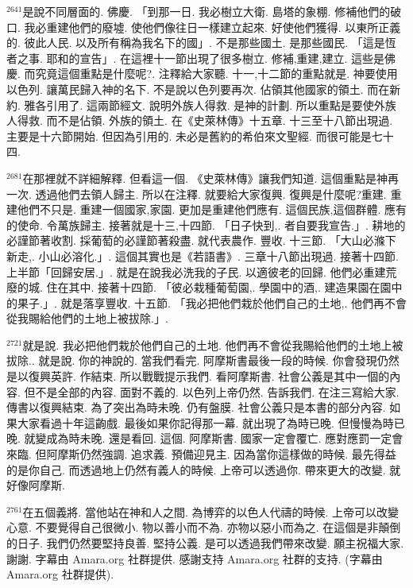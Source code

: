 \documentclass{book}
\begin{document}
$^{2641}$是說不同層面的.
佛慶.
「到那一日.
我必樹立大衛.
島塔的象棚.
修補他們的破口.
我必重建他們的廢墟.
使他們像往日一樣建立起來.
好使他們獲得.
以東所正義的.
彼此人民.
以及所有稱為我名下的國」.
不是那些國土.
是那些國民.
「這是恆者之事.
耶和的宣告」.
在這裡十一節出現了很多樹立.
修補,重建,建立.
這些是佛慶.
而究竟這個重點是什麼呢?.
注釋給大家聽.
十一,十二節的重點就是.
神要使用以色列.
讓萬民歸入神的名下.
不是說以色列要再次.
佔領其他國家的領土.
而在新約.
雅各引用了.
這兩節經文.
說明外族人得救.
是神的計劃.
所以重點是要使外族人得救.
而不是佔領.
外族的領土.
在《史萊林傳》十五章.
十三至十八節出現過.
主要是十六節開始.
但因為引用的.
未必是舊約的希伯來文聖經.
而很可能是七十四.

$^{2681}$在那裡就不詳細解釋.
但看這一個.
《史萊林傳》讓我們知道.
這個重點是神再一次.
透過他們去領人歸主.
所以在注釋.
就要給大家復興.
復興是什麼呢?重建.
重建他們不只是.
重建一個國家,家園.
更加是重建他們應有.
這個民族,這個群體.
應有的使命.
令萬族歸主.
接著就是十三,十四節.
「日子快到,.
者自要我宣告.」.
耕地的必謹節著收割.
採葡萄的必謹節著殺盡.
就代表農作.
豐收.
十三節.
「大山必滌下新走,.
小山必溶化.」.
這個其實也是《若語書》.
三章十八節出現過.
接著十四節.
上半節「回歸安居.」.
就是在說我必洗我的子民.
以適彼老的回歸.
他們必重建荒廢的城.
住在其中.
接著十四節.
「彼必栽種葡萄園,.
學園中的酒,.
建造果園在園中的果子.」.
就是落享豐收.
十五節.
「我必把他們栽於他們自己的土地,.
他們再不會從我賜給他們的土地上被拔除.」.

$^{2721}$就是說.
我必把他們栽於他們自己的土地.
他們再不會從我賜給他們的土地上被拔除..
就是說.
你的神說的.
當我們看完.
阿摩斯書最後一段的時候.
你會發現仍然是以復興英許.
作結束.
所以戰戰提示我們.
看阿摩斯書.
社會公義是其中一個的內容.
但不是全部的內容.
面對不義的.
以色列上帝仍然.
告訴我們.
在注三寫給大家.
傳書以復興結束.
為了突出為時未晚.
仍有盤膜.
社會公義只是本書的部分內容.
如果大家看過十年這齣戲.
最後如果你記得那一幕.
就出現了為時已晚.
但慢慢為時已晚.
就變成為時未晚.
還是看回.
這個.
阿摩斯書.
國家一定會覆亡.
應對應罰一定會來臨.
但阿摩斯仍然強調.
追求義.
預備迎見主.
因為當你這樣做的時候.
最先得益的是你自己.
而透過地上仍然有義人的時候.
上帝可以透過你.
帶來更大的改變.
就好像阿摩斯.

$^{2761}$在五個義將.
當他站在神和人之間.
為博弈的以色人代禱的時候.
上帝可以改變心意.
不要覺得自己很微小.
物以善小而不為.
亦物以惡小而為之.
在這個是非顛倒的日子.
我們仍然要堅持良善.
堅持公義.
是可以透過我們帶來改變.
願主祝福大家.
謝謝.
字幕由 Amara.org 社群提供.
感謝支持 Amara.org 社群的支持.
(字幕由 Amara.org 社群提供).
\newpage
\end{document}
